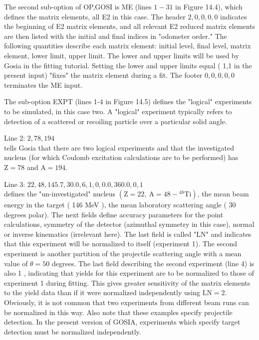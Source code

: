 \documentclass[10pt]{article}
\begin{document}
The second sub-option of OP,GOSI is ME (lines $1-31$ in Figure 14.4), which defines the matrix elements, all E2 in this case. The header $2,0,0,0,0$ indicates the beginning of E2 matrix elements, and all relevant E2 reduced matrix elements are then listed with the initial and final indices in "odometer order." The following quantities describe each matrix element: initial level, final level, matrix element, lower limit, upper limit. The lower and upper limits will be used by Gosia in the fitting tutorial. Setting the lower and upper limits equal ( 1,1 in the present input) "fixes" the matrix element during a fit. The footer $0,0,0,0,0$ terminates the ME input.

The sub-option EXPT (lines 1-4 in Figure 14.5) defines the "logical" experiments to be simulated, in this case two. A "logical" experiment typically refers to detection of a scattered or recoiling particle over a particular solid angle.

Line 2: $2,78,194$\\
tells Gosia that there are two logical experiments and that the investigated nucleus (for which Coulomb excitation calculations are to be performed) has $\mathrm{Z}=78$ and $\mathrm{A}=194$.

Line 3: $22,48,145.7,30.0,6,1,0,0.0,360.0,0,1$\\
defines the "un-investigated" nucleus $\left(\mathrm{Z}=22, \mathrm{~A}=48-{ }^{48} \mathrm{Ti}\right)$, the mean beam energy in the target ( 146 MeV ), the mean laboratory scattering angle ( 30 degrees polar). The next fields define accuracy parameters for the point calculations, symmetry of the detector (azimuthal symmetry in this case), normal or inverse kinematics (irrelevant here). The last field is called "LN" and indicates that this experiment will be normalized to itself (experiment 1). The second experiment is another partition of the projectile scattering angle with a mean value of $\theta=50$ degrees. The last field describing the second experiment (line 4) is also 1 , indicating that yields for this experiment are to be normalized to those of experiment 1 during fitting. This gives greater sensitivity of the matrix elements to the yield data than if it were normalized independently using $\mathrm{LN}=2$. Obviously, it is not common that two experiments from different beam runs can be normalized in this way. Also note that these examples specify projectile detection. In the present version of GOSIA, experiments which specify target detection must be normalized independently.
\end{document}
